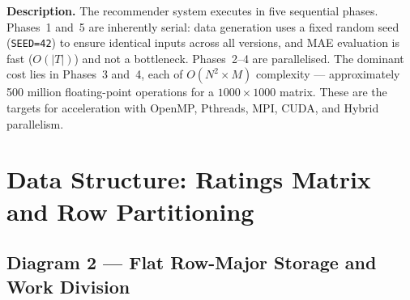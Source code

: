\documentclass[12pt,a4paper]{article}
\begin{document}
\begin{center}
\end{center}

\begin{mdframed}[style=descbox]
\textbf{Description.} The recommender system executes in five sequential
phases.  Phases~1 and~5 are inherently serial: data generation uses a fixed
random seed (\texttt{SEED=42}) to ensure identical inputs across all versions,
and MAE evaluation is fast ($O(|T|)$) and not a bottleneck.  Phases~2--4 are
parallelised.  The dominant cost lies in Phases~3 and~4, each of $O(N^2
\times M)$ complexity — approximately 500 million floating-point operations
for a $1000 \times 1000$ matrix.  These are the targets for acceleration with
OpenMP, Pthreads, MPI, CUDA, and Hybrid parallelism.
\end{mdframed}

\newpage

\section{Data Structure: Ratings Matrix and Row Partitioning}

\subsection*{Diagram 2 — Flat Row-Major Storage and Work Division}
\end{document}
